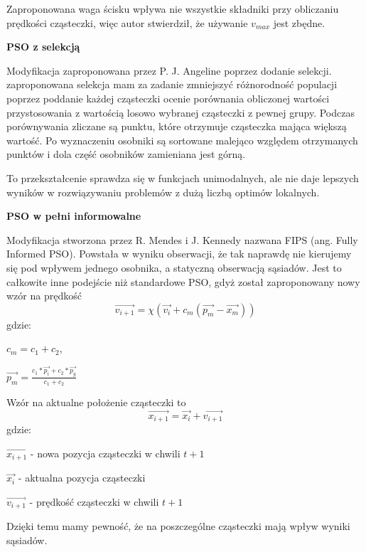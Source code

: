 \documentclass[twoside]{pracaMagisterskaMS}
\begin{document}
Zaproponowana waga ścisku wpływa nie wszystkie składniki przy obliczaniu prędkości cząsteczki, więc autor stwierdził, że używanie $v_{max}$ jest zbędne.

\textbf{PSO z selekcją }

Modyfikacja zaproponowana przez P. J. Angeline poprzez dodanie selekcji. zaproponowana selekcja mam za zadanie zmniejszyć różnorodność populacji poprzez poddanie każdej cząsteczki ocenie porównania obliczonej wartości przystosowania z wartością losowo wybranej cząsteczki z pewnej grupy. Podczas porównywania zliczane są punktu, które otrzymuje cząsteczka mająca większą wartość. Po wyznaczeniu osobniki są sortowane malejąco względem otrzymanych punktów i dola część osobników zamieniana jest górną. 

To przekształcenie sprawdza się  w funkcjach unimodalnych, ale nie daje lepszych wyników w rozwiązywaniu problemów z dużą liczbą optimów lokalnych.

\textbf{PSO w pełni informowalne}

Modyfikacja stworzona przez R. Mendes i J. Kennedy nazwana FIPS (ang. Fully Informed PSO). Powstała w wyniku obserwacji, że tak naprawdę nie kierujemy się pod wpływem jednego osobnika, a statyczną obserwacją sąsiadów. Jest to całkowite inne podejście niż standardowe PSO, gdyż został zaproponowany nowy wzór na prędkość
\begin{equation}
\vec{v_{i+1}} = \chi (\vec{v_{i}} + c_m (\vec{p_{m}} - \vec{x_{m}}))
\end{equation}
gdzie:

$c_m = c_1 + c_2$,

$\vec{p_{m}} = \frac {c_1 * \vec{p_{i}} + c_2 * \vec{p_{g}}} {c_1 + c_2}$

Wzór na aktualne położenie cząsteczki to
\begin{equation}
\vec{x_{i+1}} = \vec{x_{i}} + \vec{v_{i+1}}
\end{equation}
gdzie:

$\vec{x_{i+1}}$ - nowa pozycja cząsteczki w chwili $t + 1$

$\vec{x_{i}}$ - aktualna pozycja cząsteczki

$\vec{v_{i+1}}$ -  prędkość cząsteczki w chwili $t + 1$

Dzięki temu mamy pewność, że na poszczególne cząsteczki mają wpływ wyniki sąsiadów. 
\end{document}
